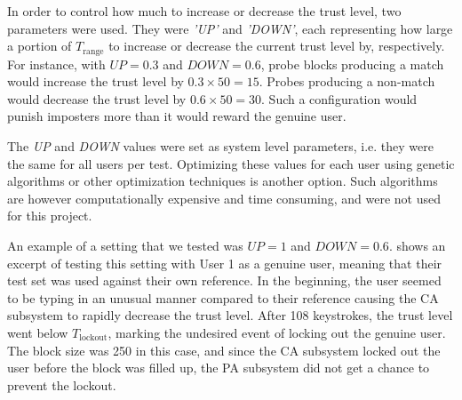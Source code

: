 
In order to control how much to increase or decrease the trust level, two parameters were used.
They were \textit{'UP'} and \textit{'DOWN'}, 
each representing how large a portion of $T_{\text{range}}$ to increase or decrease the current trust level by, respectively.
For instance, with $\textit{UP}=0.3$ and $\textit{DOWN}=0.6$, probe blocks producing a match would increase the trust level by $0.3 \times 50 = 15$.
Probes producing a non-match would decrease the trust level by $0.6 \times 50 = 30$.
Such a configuration would punish imposters more than it would reward the genuine user.

The \textit{UP} and \textit{DOWN} values were set as system level parameters, i.e. they were the same for all users per test.
Optimizing these values for each user using genetic algorithms or other optimization techniques is another option.
Such algorithms are however computationally expensive and time consuming, and were not used for this project.

An example of a setting that we tested was $\textit{UP}=1$ and $\textit{DOWN}=0.6$.
 shows an excerpt of testing this setting with User 1 as a genuine user, meaning that their test set was used against their own reference.
In the beginning, the user seemed to be typing in an unusual manner compared to their reference causing the CA subsystem to rapidly decrease the trust level.
After 108 keystrokes, the trust level went below $T_{\text{lockout}}$, marking the undesired event of locking out the genuine user.
The block size was 250 in this case, and since the CA subsystem locked out the user before the block was filled up, the PA subsystem did not get a chance to prevent the lockout.

